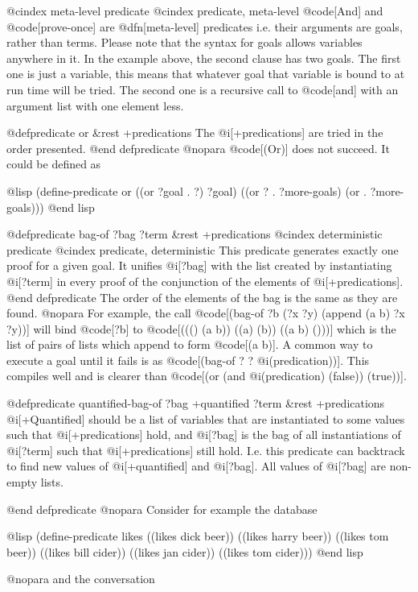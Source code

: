 {@cindex meta-level predicate
@cindex predicate, meta-level
@code[And] and @code[prove-once] are @dfn[meta-level] predicates i.e. 
their arguments are goals,
rather than terms.  Please note that the syntax for goals allows 
variables anywhere in it.  In the example above, the second clause has two
goals. The first one is just a variable, this means that whatever
goal that variable is bound to at run time will be tried. The
second one is a recursive call to @code[and] with an argument list with
one element less.

@defpredicate or &rest +predications
The @i[+predications] are tried in the order presented.
@end defpredicate
@nopara
@code[(Or)] does not succeed.  It could be defined as

@lisp
(define-predicate or
  ((or ?goal . ?) ?goal)
  ((or ? . ?more-goals) (or . ?more-goals)))
@end lisp

@defpredicate bag-of ?bag ?term &rest +predications
@cindex deterministic predicate
@cindex predicate, deterministic
This predicate generates exactly one proof for a given goal.
It  unifies @i[?bag] with the list created by
instantiating @i[?term] in every proof of the conjunction of the elements of
@i[+predications].
@end defpredicate
The order of the elements of the bag is the same as they are found.
@nopara
For example, the call @code[(bag-of ?b (?x ?y) (append (a b) ?x ?y))]
will bind @code[?b] to @code[((() (a b)) ((a) (b)) ((a b) ()))] which is 
the list of pairs of lists which append to form @code[(a b)].
A common way to execute a goal until it fails is as @code[(bag-of ? ?
@i(predication))].
This compiles well and is clearer than @code[(or (and @i(predication) (false))
(true))].

@defpredicate quantified-bag-of ?bag +quantified ?term &rest +predications
@i[+Quantified] should be a list of variables that are instantiated to some 
values such that @i[+predications] hold, and @i[?bag] is the bag of all
instantiations of @i[?term] such that @i[+predications] still hold.
I.e. this predicate can backtrack to find new values of @i[+quantified]
and @i[?bag].  All values of @i[?bag] are non-empty lists.

@end defpredicate
@nopara
Consider for example the database

@lisp
(define-predicate likes
  ((likes dick beer))
  ((likes harry beer))
  ((likes tom beer))
  ((likes bill cider))
  ((likes jan cider))
  ((likes tom cider)))
@end lisp

@nopara and the conversation

}

